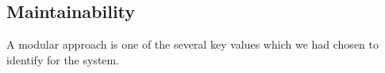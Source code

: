 \documentclass[../../../RASD.tex]{subfiles}
\begin{document}
\subsection{Maintainability\label{sect:3.5.4}}

A modular approach is one of the several key values which we had chosen to identify for the system.
\end{document}
